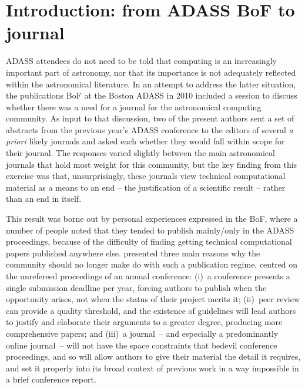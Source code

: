 \documentclass[11pt,twoside]{article}
\begin{document}
\section{Introduction: from ADASS BoF to journal}

ADASS attendees do not need to be told that computing is an increasingly important part of astronomy, nor that its importance is not adequately reflected within the astronomical literature. In an attempt to address the latter situation, the publications BoF at the Boston ADASS in 2010 included a session to discuss whether there was a need for a journal for the astronomical computing community. 
As input to that discussion, two of the present authors sent a set of abstracts from the previous year's ADASS conference to the editors of several {\em a priori\/} likely journals and asked each whether they would fall within scope for their journal. The responses \citep[summarised by][]{graymann} varied slightly between the main astronomical journals that hold most weight for this community, but the key finding from this exercise was that, unsurprisingly, these journals view technical computational material as a means to an end -- the justification of a scientific result -- rather than an end in itself. 

This result was borne out by personal experiences expressed in the BoF, where a number of people noted that they tended to publish mainly/only in the ADASS proceedings, because of the difficulty of finding getting technical computational papers published anywhere else. 
\cite{graymann} presented three main reasons why the community should no longer make do
 with such a publication regime, centred on the unrefereed
proceedings of an annual conference: (i)~a conference presents a
single submission deadline per year, forcing authors to publish when
the opportunity arises, not when the status of their project merits
it; (ii)~peer review can provide a quality threshold, and the
existence of guidelines will lead authors to justify and elaborate
their arguments to a greater degree, producing more comprehensive
papers; and (iii)~a journal~-- and especially a predominantly online
journal~-- will not have the space constraints that bedevil conference
proceedings, and so will allow authors to give their material the
detail it requires, and set it properly into its broad context of
previous work in a way impossible in a brief conference
report.
\end{document}

